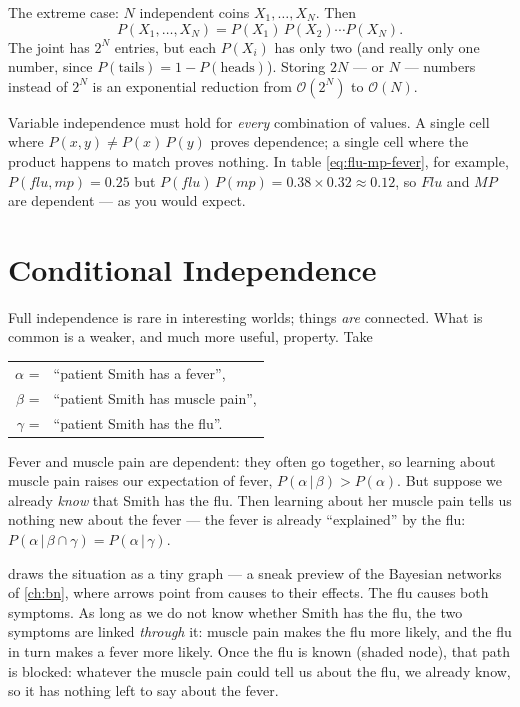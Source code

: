 \documentclass[11pt, oneside]{book}
\newcommand{\Prob}{\mathbb{P}}           %
\newcommand{\bigO}[1]{\mathcal{O}\!\left(#1\right)}
\newcommand{\given}{\,\vert\,}           %
\newcommand{\vn}[1]{\mathit{#1}}         %
\let\originalsection\section
\renewcommand{\section}{\Needspace{7\baselineskip}\originalsection}
\begin{document}
The extreme case: $N$ independent coins $X_1, \ldots, X_N$. Then
\[
P(X_1, \ldots, X_N) = P(X_1)\,P(X_2) \cdots P(X_N).
\]
The joint has $2^N$
entries, but each $P(X_i)$ has only two (and really only one number, since
$P(\text{tails}) = 1 - P(\text{heads})$). Storing $2N$ --- or $N$ ---
numbers instead of $2^N$ is an exponential reduction from $\bigO{2^N}$ to
$\bigO{N}$.

\begin{notebox}[title={Checking independence: one cell can only disprove it}, unbreakable]
Variable independence must hold for \emph{every} combination of values. A
single cell where $P(x, y) \neq P(x)\,P(y)$ proves dependence; a single cell
where the product happens to match proves nothing. In table
\eqref{eq:flu-mp-fever}, for example, $P(\vn{flu}, \vn{mp}) = 0.25$ but
$P(\vn{flu})\,P(\vn{mp}) = 0.38 \times 0.32 \approx 0.12$, so $\vn{Flu}$ and
$\vn{MP}$ are dependent --- as you would expect.
\end{notebox}

\section{Conditional Independence}
\label{sec:cond-indep}

Full independence is rare in interesting worlds; things \emph{are} connected.
What is common is a weaker, and much more useful, property. Take
\begin{center}
\begin{tabular}{@{}r@{\ \ }l@{}}
$\alpha$ = & ``patient Smith has a fever'', \\
$\beta$ = & ``patient Smith has muscle pain'', \\
$\gamma$ = & ``patient Smith has the flu''.
\end{tabular}
\end{center}
Fever and muscle pain are dependent: they often go together, so learning about
muscle pain raises our expectation of fever, $P(\alpha \given \beta) >
P(\alpha)$. But suppose we already \emph{know} that Smith has the flu. Then
learning about her muscle pain tells us nothing new about the fever --- the
fever is already ``explained'' by the flu: $P(\alpha \given \beta \cap \gamma)
= P(\alpha \given \gamma)$.

 draws the situation as a tiny graph --- a sneak preview of
the Bayesian networks of \cref{ch:bn}, where arrows point from causes to their
effects. The flu causes both symptoms. As long as we do not know whether Smith
has the flu, the two symptoms are linked \emph{through} it: muscle pain makes
the flu more likely, and the flu in turn makes a fever more likely. Once the
flu is known (shaded node), that path is blocked: whatever the muscle pain
could tell us about the flu, we already know, so it has nothing left to say
about the fever.
\end{document}
